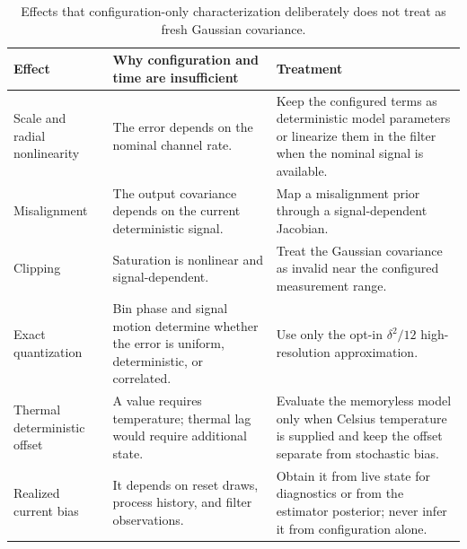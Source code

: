 \documentclass[11pt,oneside,headings=big]{scrreprt}
\begin{document}
    \begin{table}[htbp]
        \centering
        \caption{Effects that configuration-only characterization deliberately does not
        treat as fresh Gaussian covariance.}
        \label{tab:characterization-limits}
        \begin{tabularx}{\textwidth}{@{}L{1.55in}Y Y@{}}
\toprule
\textbf{Effect} & \textbf{Why configuration and time are insufficient} & \textbf{Treatment} \\
\midrule
Scale and radial nonlinearity & The error depends on the nominal channel rate. & Keep the configured terms as deterministic model parameters or linearize them in the filter when the nominal signal is available. \\
Misalignment & The output covariance depends on the current deterministic signal. & Map a misalignment prior through a signal-dependent Jacobian. \\
Clipping & Saturation is nonlinear and signal-dependent. & Treat the Gaussian covariance as invalid near the configured measurement range. \\
Exact quantization & Bin phase and signal motion determine whether the error is uniform, deterministic, or correlated. & Use only the opt-in $\delta^2/12$ high-resolution approximation. \\
Thermal deterministic offset & A value requires temperature; thermal lag would require additional state. & Evaluate the memoryless model only when Celsius temperature is supplied and keep the offset separate from stochastic bias. \\
Realized current bias & It depends on reset draws, process history, and filter observations. & Obtain it from live state for diagnostics or from the estimator posterior; never infer it from configuration alone. \\
\bottomrule
        \end{tabularx}
    \end{table}
\end{document}
